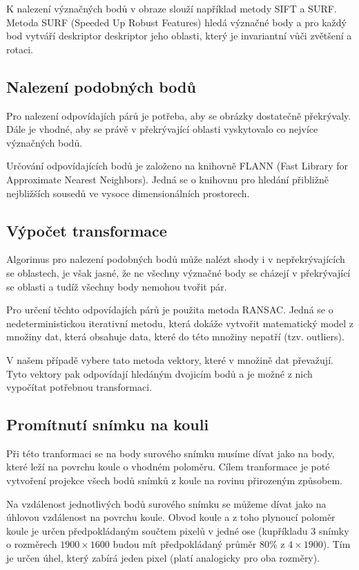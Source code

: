 \documentclass[12pt,a4paper,titlepage,final]{article}
\begin{document}
K nalezení význačných bodů v obraze slouží například metody SIFT a SURF. 
Metoda SURF (Speeded Up Robust Features) hledá význačné body a pro každý bod
vytváří deskriptor deskriptor jeho oblasti, který je invariantní vůči
zvětšení a rotaci.

\subsection{Nalezení podobných bodů}

Pro nalezení odpovídajích párů je potřeba, aby se obrázky dostatečně překrývaly.
Dále je vhodné, aby se právě v překrývající oblasti vyskytovalo co nejvíce význačných
bodů.

Určování odpovídajících bodů je založeno na knihovně FLANN (Fast Library for
Approximate Nearest Neighbors). Jedná se o knihovnu pro hledání přibližně
nejbližších sousedů ve vysoce dimensionálních prostorech.

\subsection{Výpočet transformace}

Algorimus pro nalezení podobných bodů může nalézt shody i v nepřekrývajících se
oblastech, je však jasné, že ne všechny význačné body se cházejí v překrývající
se oblasti a tudíž všechny body nemohou tvořit pár.

Pro určení těchto odpovídajích párů je použita metoda RANSAC. Jedná se o
nedeterministickou iterativní metodu, která dokáže vytvořit matematický model
z množiny dat, která obsahuje data, které do této množiny nepatří (tzv. outliers).

V našem případě vybere tato metoda vektory, které v množině dat převažují.
Tyto vektory pak odpovídají hledáným dvojicím bodů a je možné z nich vypočítat
potřebnou transformaci.

\subsection{Promítnutí snímku na kouli}

Při této tranformaci se na body surového snímku musíme dívat jako na body, které
leží na povrchu koule o vhodném poloměru. Cílem tranformace je poté vytvoření
projekce všech bodů snímků z koule na rovinu přirozeným způsobem.

Na vzdálenost jednotlivých bodů surového snímku se můžeme dívat jako na úhlovou
vzdálenost na povrchu koule. Obvod koule a z toho plynoucí poloměr koule je určen
předpokládaným součtem pixelů v jedné ose (kupříkladu 3 snímky o rozměrech
$1900{\times}1600$
budou mít předpokládaný průměr 80\% z $4{\times}1900$). Tím je určen úhel, který zabírá
jeden pixel (platí analogicky pro oba rozměry).
\end{document}
